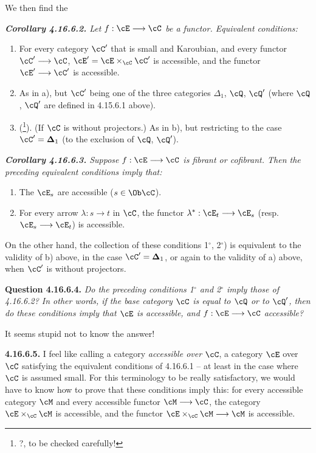 \setcounter{footnote}{195}


We then find the

\begingroup\itshape
\noindent\textbf{\upshape Corollary 4.16.6.2.} Let $f : \cE \longrightarrow \cC$ be a functor. Equivalent conditions:
\begin{enumerate}[label={}]
\item[a)] For every category $\cC'$ that is \textup{small} and \textup{Karoubian}, and every functor $\cC' \longrightarrow \cC$, $\cE' = \cE \times_{\cC} \cC'$ is accessible, and the functor $\cE' \longrightarrow \cC'$ is accessible.
\item[b)] As in a), but $\cC'$ being one of the three categories $\Delta_1$, $\cQ$, $\cQ'$ (where $\cQ$, $\cQ'$ are defined in 4.15.6.1 above).
\item[b$'$)] \textup{(}\footnote{?, to be checked carefully!}\textup{)}. (If $\cC$ is without projectors.) As in b), but restricting to the case $\cC' = \boldsymbol{\Delta}_1$ (to the exclusion of $\cQ$, $\cQ'$).
\end{enumerate}
\endgroup

\begingroup\itshape
\noindent\textbf{\upshape Corollary 4.16.6.3.} Suppose $f : \cE \longrightarrow \cC$ is fibrant or cofibrant. Then the preceding equivalent conditions imply that:
\begin{enumerate}[label={}]
\item[1$^\circ$)] The $\cE_s$ are accessible ($s \in \Ob \cC$).
\item[2$^\circ$)] For every arrow $\lambda : s \longrightarrow t$ in $\cC$, the functor $\lambda^* : \cE_t \longrightarrow \cE_s$ (resp. $\cE_s \longrightarrow \cE_t$) is accessible.
\end{enumerate}
\noindent On the other hand, the collection of these conditions 1$^\circ$, 2$^\circ$) is equivalent to the validity of b) above, in the case $\cC' = \boldsymbol{\Delta}_1$, or again to the validity
of a) above, when $\cC'$ is \textup{without projectors}.
\endgroup

\textbf{Question 4.16.6.4.} \textit{Do the preceding conditions 1$^\circ$ and 2$^\circ$ imply those of 4.16.6.2? In other words, if the base category $\cC$ is equal to $\cQ$ or to $\cQ'$, then do these conditions imply that $\cE$ is accessible, and $f : \cE \longrightarrow \cC$ accessible?}

It seems stupid not to know the answer!

\textbf{4.16.6.5.} I feel like calling a category \textit{accessible over $\cC$}, a category $\cE$ over $\cC$ satisfying the equivalent conditions of 4.16.6.1 -- at least in the case where $\cC$ is assumed small. For this terminology to be really satisfactory, we would have to know how to prove that these conditions imply this: for every accessible category $\cM$ and every accessible functor $\cM \longrightarrow \cC$, the category $\cE \times_{\cC} \cM$ is accessible, and the functor $\cE \times_{\cC} \cM \longrightarrow \cM$ is accessible. %

